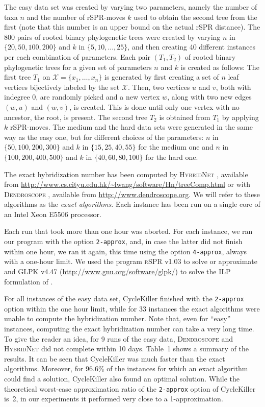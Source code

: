 The easy data set was created by varying  two parameters, namely the number of taxa $n$ and the number of rSPR-moves $k$ used to obtain the
second tree from the first (note that this number is an upper bound on the actual rSPR distance). The 800 pairs of rooted binary phylogenetic trees were created by varying  
$n$ in $\{20,50,100,200\}$ and $k$ in $\{5,10,...,25\}$, and then creating 40 different instances per each combination of parameters.
Each pair $(T_1,T_2)$ of  rooted binary phylogenetic trees for a given set of parameters  $n$ and $k$ is created as follows: 
The first tree $T_1$ on $\mathcal{X}=\{x_1,\dots,x_n\}$ is generated  by first creating a set of  $n$ leaf vertices bijectively labeled by the set $\mathcal{X}$. Then, 
two vertices $u$ and $v$, both with indegree 0, are randomly
picked  and  a new vertex $w$, along with two new edges $(w,u)$ and $(w,v)$, is created. This is done until only one vertex with no ancestor, the root, is present. The  second tree $T_2$ is  obtained from $T_1$ by applying $k$ rSPR-moves.
The medium and the hard data sets were generated in the same way as the easy one, but for different choices of the parameters:   $n$ in $\{50,100,200,300\}$ and $k$ in $\{15,25,40,55\}$ for the medium one and $n$ in $\{100,200,400,500\}$  and $k$ in $\{40,60,80,100\}$ for the hard one.



The exact hybridization number has been computed by \textsc{HybridNet} \cite{hybridnet}, available from \url{http://www.cs.cityu.edu.hk/~lwang/software/Hn/treeComp.html} or with  \textsc{Dendroscope} \cite{Dendroscope3}, available from \url{http://www.dendroscope.org}. We will refer to these algorithms as the \emph{exact algorithms}. Each instance has been run on a single core of an Intel Xeon E5506 processor.

Each  run that took more than one hour was aborted. For each instance, we ran our program with the option \texttt{2-approx}, and, in case the latter did not finish within one hour, we ran it again, this time using the option \texttt{4-approx}, always with a one-hour limit. We used the program \textsc{rSPR} v1.03 \cite{whiddenRSPRwebsite,whiddenRSPRexp} to solve or approximate \maf and GLPK v4.47 (\url{http://www.gnu.org/software/glpk/}) to solve the ILP formulation of \textsc{\dfvs}.

For all instances of the easy data set, {\sc CycleKiller} finished with the \texttt{2-approx} option within the one hour limit, while for 33 instances the exact algorithms were unable to compute the hybridization number. Note that, even for ``easy'' instances, computing the exact hybridization number can take a very long time. To give the reader an idea, for 9 runs of the easy data, \textsc{Dendroscope} and \textsc{HybridNet} did not complete within 10 days. Table~1 shows a summary of the results. It can be seen that {\sc CycleKiller} was much faster than the exact algorithms. Moreover, for 96.6\% of the instances for which an exact algorithm could find a solution, {\sc CycleKiller} also found an optimal solution. While the theoretical worst-case approximation ratio of the \texttt{2-approx} option of {\sc CycleKiller} is~2, in our experiments it performed very close to a 1-approximation.

